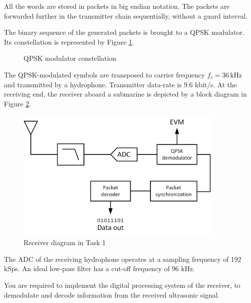 \documentclass[a4paper]{article}
\begin{document}
All the words are stored in packets in big endian notation. The packets are forwarded further in the transmitter chain sequentially, without a guard interval.

The binary sequence of the generated packets is brought to a QPSK modulator. Its constellation is represented by Figure \ref{fig:qpsk}.

\begin{figure}[h!]
\centering
{}
\caption{QPSK modulator constellation}
\label{fig:qpsk}
\end{figure}

The QPSK-modulated symbols are transposed to carrier frequency $f_c = 36 \,\textrm{kHz}$ and transmitted by a hydrophone. Transmitter data-rate is 9.6 kbit/s. At the receiving end, the receiver aboard a submarine is depicted by a block diagram in Figure \ref{fig:task1}.

\begin{figure}[h!]
\centering
\includegraphics[width=0.9\textwidth]{Task1.png}
\caption{Receiver diagram in Task 1}
\label{fig:task1}
\end{figure}

The ADC of the receiving hydrophone operates at a sampling frequency of 192 kSps. An ideal low-pass filter has a cut-off frequency of 96 kHz.

You are required to implement the digital processing system of the receiver, to demodulate and decode information from the received ultrasonic signal.
\end{document}
